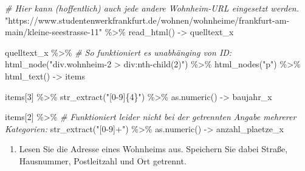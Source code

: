 \documentclass[
  ngerman,
]{article}
\newenvironment{Shaded}{\begin{snugshade}}{\end{snugshade}}
\newcommand{\CommentTok}[1]{\textcolor[rgb]{0.56,0.35,0.01}{\textit{#1}}}
\newcommand{\DecValTok}[1]{\textcolor[rgb]{0.00,0.00,0.81}{#1}}
\newcommand{\FunctionTok}[1]{\textcolor[rgb]{0.00,0.00,0.00}{#1}}
\newcommand{\NormalTok}[1]{#1}
\newcommand{\OtherTok}[1]{\textcolor[rgb]{0.56,0.35,0.01}{#1}}
\newcommand{\SpecialCharTok}[1]{\textcolor[rgb]{0.00,0.00,0.00}{#1}}
\newcommand{\StringTok}[1]{\textcolor[rgb]{0.31,0.60,0.02}{#1}}
\providecommand{\tightlist}{%
  \setlength{\itemsep}{0pt}\setlength{\parskip}{0pt}}
\begin{document}
\begin{Shaded}
\begin{Highlighting}[]
\CommentTok{\# Hier kann (hoffentlich) auch jede andere Wohnheim{-}URL eingesetzt werden.}
\StringTok{"https://www.studentenwerkfrankfurt.de/wohnen/wohnheime/frankfurt{-}am{-}main/kleine{-}seestrasse{-}11"} \SpecialCharTok{\%\textgreater{}\%}
  \FunctionTok{read\_html}\NormalTok{() }\OtherTok{{-}\textgreater{}}\NormalTok{ quelltext\_x}

\NormalTok{quelltext\_x }\SpecialCharTok{\%\textgreater{}\%}
  \CommentTok{\# So funktioniert es unabhänging von ID:}
  \FunctionTok{html\_node}\NormalTok{(}\StringTok{"div.wohnheim{-}2 \textgreater{} div:nth{-}child(2)"}\NormalTok{) }\SpecialCharTok{\%\textgreater{}\%}
  \FunctionTok{html\_nodes}\NormalTok{(}\StringTok{"p"}\NormalTok{) }\SpecialCharTok{\%\textgreater{}\%}
  \FunctionTok{html\_text}\NormalTok{() }\OtherTok{{-}\textgreater{}}\NormalTok{ items}

\NormalTok{items[}\DecValTok{3}\NormalTok{] }\SpecialCharTok{\%\textgreater{}\%}
  \FunctionTok{str\_extract}\NormalTok{(}\StringTok{"[0{-}9]\{4\}"}\NormalTok{) }\SpecialCharTok{\%\textgreater{}\%}
  \FunctionTok{as.numeric}\NormalTok{() }\OtherTok{{-}\textgreater{}}\NormalTok{ baujahr\_x}

\NormalTok{items[}\DecValTok{2}\NormalTok{] }\SpecialCharTok{\%\textgreater{}\%}
  \CommentTok{\# Funktioniert leider nicht bei der getrennten Angabe mehrerer Kategorien:}
  \FunctionTok{str\_extract}\NormalTok{(}\StringTok{"[0{-}9]+"}\NormalTok{) }\SpecialCharTok{\%\textgreater{}\%}
  \FunctionTok{as.numeric}\NormalTok{() }\OtherTok{{-}\textgreater{}}\NormalTok{ anzahl\_plaetze\_x}
\end{Highlighting}
\end{Shaded}

\begin{enumerate}
\def\labelenumi{\arabic{enumi}.}
\setcounter{enumi}{3}
\tightlist
\item
  Lesen Sie die Adresse eines Wohnheims aus. Speichern Sie dabei Straße, Hausnummer, Postleitzahl und Ort getrennt.
\end{enumerate}
\end{document}
